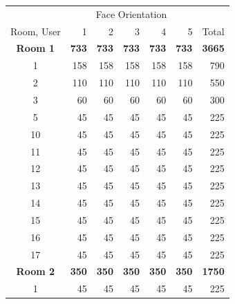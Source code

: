 \begin{table}[tbp]
	\centering
	\begin{tabular}{@{}crrrrrr@{}}
		\toprule
		& \multicolumn{5}{c}{Face Orientation}                                     &               \\
		Room, User & 1            & 2            & 3            & 4            & 5            & Total         \\ \midrule
		\textbf{Room 1} & \textbf{733} & \textbf{733} & \textbf{733} & \textbf{733} & \textbf{733} & \textbf{3665} \\ \midrule
		1          & 158          & 158          & 158          & 158          & 158          & 790           \\
		2          & 110          & 110          & 110          & 110          & 110          & 550           \\
		3          & 60           & 60           & 60           & 60           & 60           & 300           \\
		5          & 45           & 45           & 45           & 45           & 45           & 225           \\
		10         & 45           & 45           & 45           & 45           & 45           & 225           \\
		11         & 45           & 45           & 45           & 45           & 45           & 225           \\
		12         & 45           & 45           & 45           & 45           & 45           & 225           \\
		13         & 45           & 45           & 45           & 45           & 45           & 225           \\
		14         & 45           & 45           & 45           & 45           & 45           & 225           \\
		15         & 45           & 45           & 45           & 45           & 45           & 225           \\
		16         & 45           & 45           & 45           & 45           & 45           & 225           \\
		17         & 45           & 45           & 45           & 45           & 45           & 225           \\ \midrule
		\textbf{Room 2} & \textbf{350} & \textbf{350} & \textbf{350} & \textbf{350} & \textbf{350} & \textbf{1750} \\ \midrule
		1          & 45           & 45           & 45           & 45           & 45           & 225           \\

\end{tabular}
\end{table}
